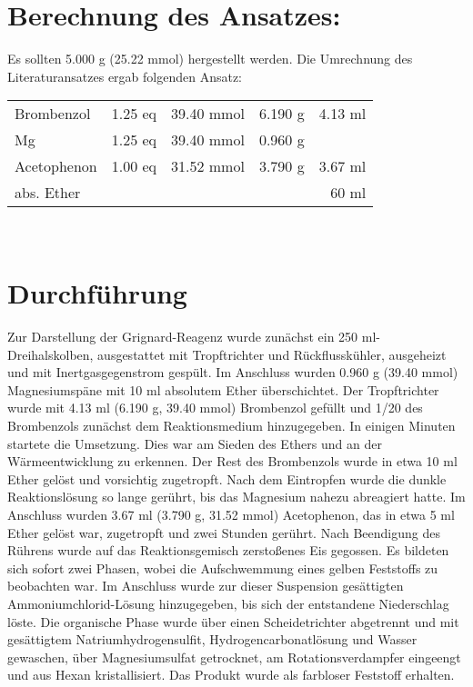 \documentclass[12pt]{article}
\begin{document}
\begin{onehalfspace}
\section{Berechnung des Ansatzes: } 
Es sollten 5.000 g (25.22 mmol)  hergestellt werden. Die Umrechnung des Literaturansatzes \cite{organikum} ergab folgenden Ansatz:\\[0.5cm]
\begin{tabular}{lrrrr}
Brombenzol & 1.25 eq  & 39.40 mmol & 6.190 g & 4.13 ml\\
Mg  & 1.25 eq  & 39.40 mmol &  0.960 g & \\
Acetophenon  & 1.00 eq & 31.52 mmol & 3.790 g & 3.67 ml\\
abs. Ether &   & &  & 60 ml\\
\end{tabular}\\[0.5cm]
\normalsize \section{Durchführung \cite{organikum}} 
Zur Darstellung der Grignard-Reagenz wurde zunächst ein 250 ml-Dreihalskolben, ausgestattet mit Tropftrichter und Rückflusskühler, ausgeheizt und mit Inertgasgegenstrom gespült. Im Anschluss wurden 0.960 g (39.40 mmol) Magnesiumspäne mit 10 ml absolutem Ether überschichtet. Der Tropftrichter wurde mit 4.13 ml (6.190 g, 39.40 mmol) Brombenzol gefüllt und 1/20 des Brombenzols zunächst dem Reaktionsmedium hinzugegeben. In einigen Minuten startete die Umsetzung. Dies war am Sieden des Ethers und an der Wärmeentwicklung zu erkennen. Der Rest des Brombenzols wurde in etwa 10 ml Ether gelöst und vorsichtig zugetropft. Nach dem Eintropfen wurde die dunkle Reaktionslösung so lange gerührt, bis das Magnesium nahezu abreagiert hatte. Im Anschluss wurden 3.67 ml (3.790 g, 31.52 mmol) Acetophenon, das in etwa 5 ml Ether gelöst war, zugetropft und zwei Stunden gerührt. Nach Beendigung des Rührens wurde auf das Reaktionsgemisch zerstoßenes Eis gegossen. Es bildeten sich sofort zwei Phasen, wobei die Aufschwemmung eines gelben Feststoffs zu beobachten war. Im Anschluss wurde zur dieser Suspension gesättigten Ammoniumchlorid-Lösung hinzugegeben, bis sich der entstandene Niederschlag löste. Die organische Phase wurde über einen Scheidetrichter abgetrennt und mit gesättigtem Natriumhydrogensulfit, Hydrogencarbonatlösung und Wasser gewaschen, über Magnesiumsulfat getrocknet, am Rotationsverdampfer eingeengt und aus Hexan kristallisiert. Das Produkt wurde als farbloser Feststoff erhalten.

\end{onehalfspace}
\end{document}

